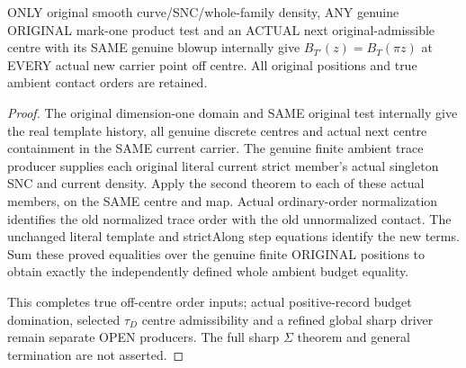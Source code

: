 \begin{theorem}
\label{hir:sharp-original-curve-ambient-budget-off-centre-equality}
\leanok
ONLY original smooth curve/SNC/whole-family density, ANY genuine ORIGINAL
mark-one product test and an ACTUAL next original-admissible centre with
its SAME genuine blowup internally give
$B_{T'}(z)=B_T(\pi z)$ at EVERY actual new carrier point off centre.
All original positions and true ambient contact orders are retained.
\end{theorem}
\begin{proof}
The original dimension-one domain and SAME original test internally give
the real template history, all genuine discrete centres and actual next
centre containment in the SAME current carrier. The genuine finite
ambient trace producer supplies each original literal current strict
member's actual singleton SNC and current density. Apply the second
theorem to each of these actual members, on the SAME centre and map.
Actual ordinary-order normalization identifies the old normalized trace
order with the old unnormalized contact. The unchanged literal template
and strictAlong step equations identify the new terms. Sum these proved
equalities over the genuine finite ORIGINAL positions to obtain exactly
the independently defined whole ambient budget equality.

This completes true off-centre order inputs; actual positive-record
budget domination, selected $\tau_D$ centre admissibility and a refined
global sharp driver remain separate OPEN producers. The full sharp
$\Sigma$ theorem and general termination are not asserted.
\end{proof}

